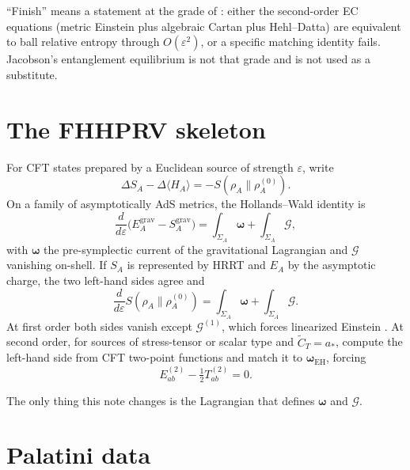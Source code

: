 \documentclass[11pt]{article}
\theoremstyle{definition}
\begin{document}
``Finish'' means a statement at the grade of \cite{FHHPRV2017}:
either the second-order EC equations (metric Einstein plus algebraic
Cartan plus Hehl--Datta) are equivalent to ball relative entropy
through $O(\varepsilon^2)$, or a specific matching identity fails.
Jacobson's entanglement equilibrium \cite{Jacobson2016} is not that
grade and is not used as a substitute.

\section{The FHHPRV skeleton}

For CFT states prepared by a Euclidean source of strength
$\varepsilon$, write
\begin{equation}
\Delta S_A-\Delta\langle H_A\rangle
=
-S(\rho_A\|\rho_A^{(0)}).
\label{eq:rel}
\end{equation}
On a family of asymptotically AdS metrics, the Hollands--Wald
identity \cite{HollandsWald2013} is
\begin{equation}
\frac{d}{d\varepsilon}\bigl(E_A^{\mathrm{grav}}-S_A^{\mathrm{grav}}\bigr)
=
\int_{\Sigma_A}\boldsymbol{\omega}
+
\int_{\Sigma_A}\mathcal{G},
\label{eq:HW}
\end{equation}
with $\boldsymbol{\omega}$ the pre-symplectic current of the gravitational
Lagrangian and $\mathcal{G}$ vanishing on-shell. If $S_A$ is
represented by HRRT and $E_A$ by the asymptotic charge, the two
left-hand sides agree and
\begin{equation}
\frac{d}{d\varepsilon}S(\rho_A\|\rho_A^{(0)})
=
\int_{\Sigma_A}\boldsymbol{\omega}+\int_{\Sigma_A}\mathcal{G}.
\label{eq:master}
\end{equation}
At first order both sides vanish except $\mathcal{G}^{(1)}$, which
forces linearized Einstein \cite{FGHMV2014}. At second order, for
sources of stress-tensor or scalar type and $\widetilde{C}_T=a_\ast$,
\cite{FHHPRV2017} compute the left-hand side from CFT two-point
functions and match it to $\boldsymbol{\omega}_{\mathrm{EH}}$, forcing
\begin{equation}
E_{ab}^{(2)}-\tfrac12 T_{ab}^{(2)}=0.
\label{eq:ein2}
\end{equation}

The only thing this note changes is the Lagrangian that defines
$\boldsymbol{\omega}$ and $\mathcal{G}$.

\section{Palatini data}
\end{document}
